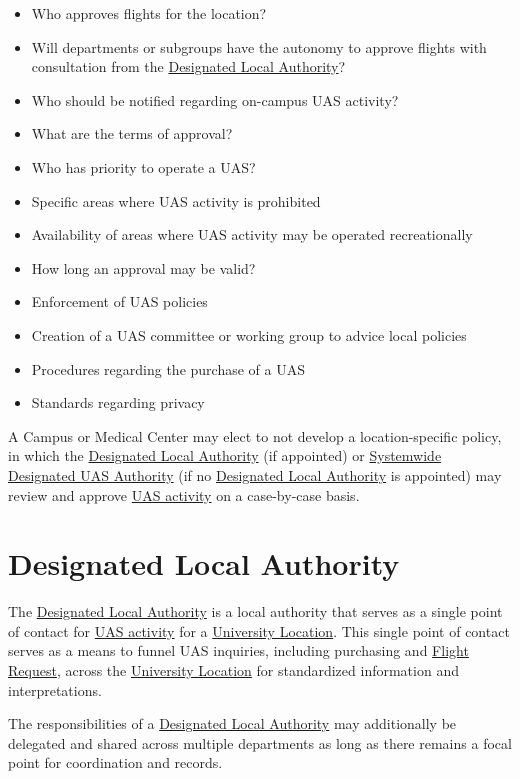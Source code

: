 \documentclass[
]{book}
\providecommand{\tightlist}{%
  \setlength{\itemsep}{0pt}\setlength{\parskip}{0pt}}
\begin{document}
\begin{itemize}
\tightlist
\item
  Who approves flights for the location?
\item
  Will departments or subgroups have the autonomy to approve flights with consultation from the \protect\hyperlink{DLA}{Designated Local Authority}?
\item
  Who should be notified regarding on-campus UAS activity?
\item
  What are the terms of approval?
\item
  Who has priority to operate a UAS?
\item
  Specific areas where UAS activity is prohibited
\item
  Availability of areas where UAS activity may be operated recreationally
\item
  How long an approval may be valid?
\item
  Enforcement of UAS policies
\item
  Creation of a UAS committee or working group to advice local policies
\item
  Procedures regarding the purchase of a UAS
\item
  Standards regarding privacy
\end{itemize}

A Campus or Medical Center may elect to not develop a location-specific policy, in which the \protect\hyperlink{DLA}{Designated Local Authority} (if appointed) or \protect\hyperlink{SDA}{Systemwide Designated UAS Authority} (if no \protect\hyperlink{DLA}{Designated Local Authority} is appointed) may review and approve \protect\hyperlink{UASactivity}{UAS activity} on a case-by-case basis.

\hypertarget{sec_DLA}{%
\section{Designated Local Authority}\label{sec_DLA}}

The \protect\hyperlink{DLA}{Designated Local Authority} is a local authority that serves as a single point of contact for \protect\hyperlink{UASactivity}{UAS activity} for a \protect\hyperlink{UL}{University Location}. This single point of contact serves as a means to funnel UAS inquiries, including purchasing and \protect\hyperlink{FR}{Flight Request}, across the \protect\hyperlink{UL}{University Location} for standardized information and interpretations.

The responsibilities of a \protect\hyperlink{DLA}{Designated Local Authority} may additionally be delegated and shared across multiple departments as long as there remains a focal point for coordination and records.
\end{document}

